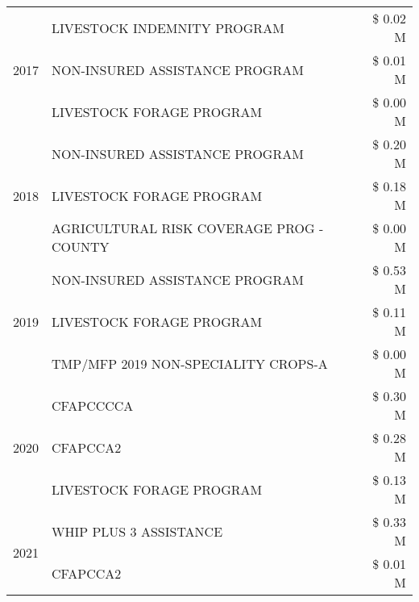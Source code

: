 \begin{tabular}{llr}
\cline{1-3}
\multirow[t]{3}{*}{2017} & LIVESTOCK INDEMNITY PROGRAM & \$ 0.02 M \\
 & NON-INSURED ASSISTANCE PROGRAM & \$ 0.01 M \\
 & LIVESTOCK FORAGE PROGRAM & \$ 0.00 M \\
\cline{1-3}
\multirow[t]{3}{*}{2018} & NON-INSURED ASSISTANCE PROGRAM & \$ 0.20 M \\
 & LIVESTOCK FORAGE PROGRAM & \$ 0.18 M \\
 & AGRICULTURAL RISK COVERAGE PROG - COUNTY & \$ 0.00 M \\
\cline{1-3}
\multirow[t]{3}{*}{2019} & NON-INSURED ASSISTANCE PROGRAM & \$ 0.53 M \\
 & LIVESTOCK FORAGE PROGRAM & \$ 0.11 M \\
 & TMP/MFP 2019 NON-SPECIALITY CROPS-A & \$ 0.00 M \\
\cline{1-3}
\multirow[t]{3}{*}{2020} & CFAPCCCCA & \$ 0.30 M \\
 & CFAPCCA2 & \$ 0.28 M \\
 & LIVESTOCK FORAGE PROGRAM & \$ 0.13 M \\
\cline{1-3}
\multirow[t]{2}{*}{2021} & WHIP PLUS 3 ASSISTANCE & \$ 0.33 M \\
 & CFAPCCA2 & \$ 0.01 M \\
\cline{1-3}
\bottomrule
\end{tabular}
